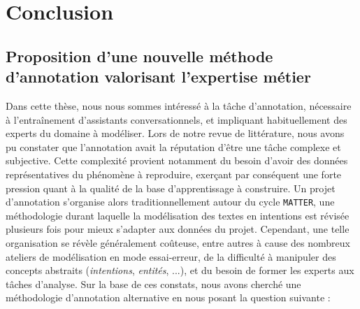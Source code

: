 \chapter{Conclusion}
\label{chapter:6-CONCLUSION}
	
	\section*{Proposition d'une nouvelle méthode d'annotation valorisant l'expertise métier}
	
		Dans cette thèse, nous nous sommes intéressé à la tâche d'annotation, nécessaire à l'entraînement d'assistants conversationnels, et impliquant habituellement des experts du domaine à modéliser.
		Lors de notre revue de littérature, nous avons pu constater que l'annotation avait la réputation d'être une tâche complexe et subjective.
		Cette complexité provient notamment du besoin d'avoir des données représentatives du phénomène à reproduire, exerçant par conséquent une forte pression quant à la qualité de la base d'apprentissage à construire.
		Un projet d'annotation s'organise alors traditionnellement autour du cycle \texttt{MATTER}, une méthodologie durant laquelle la modélisation des textes en intentions est révisée plusieurs fois pour mieux s'adapter aux données du projet.
		Cependant, une telle organisation se révèle généralement coûteuse, entre autres à cause des nombreux ateliers de modélisation en mode essai-erreur, de la difficulté à manipuler des concepts abstraits (\textit{intentions}, \textit{entités}, ...), et du besoin de former les experts aux tâches d'analyse.
		Sur la base de ces constats, nous avons cherché une méthodologie d'annotation alternative en nous posant la question suivante : 
		
